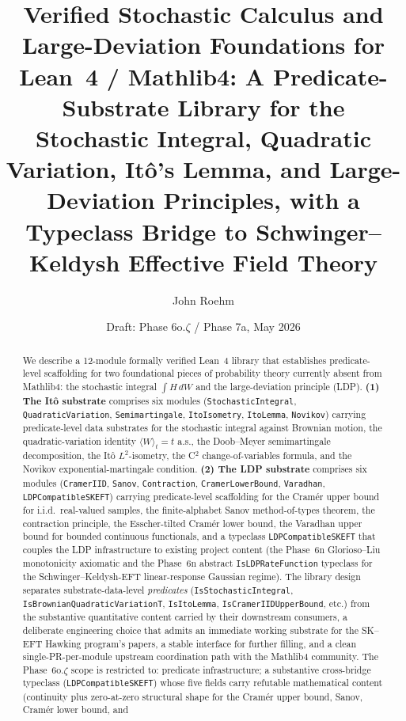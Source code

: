 \documentclass[11pt]{article}
\title{Verified Stochastic Calculus and Large-Deviation Foundations
for Lean~4 / Mathlib4: A Predicate-Substrate Library for the
Stochastic Integral, Quadratic Variation, It\^o's Lemma, and
Large-Deviation Principles, with a Typeclass Bridge to
Schwinger--Keldysh Effective Field Theory}
\author{John Roehm}
\date{Draft: Phase 6o.$\zeta$ / Phase 7a, May 2026}
\begin{document}
\maketitle

\begin{abstract}
We describe a 12-module formally verified Lean~4 library that establishes
predicate-level scaffolding for two foundational pieces of probability
theory currently absent from Mathlib4: the stochastic integral $\int H\,dW$
and the large-deviation principle (LDP).
\textbf{(1) The It\^o substrate} comprises six modules
(\texttt{Stochastic\-Integral}, \texttt{Quadratic\-Variation},
\texttt{Semi\-martingale}, \texttt{Ito\-Isometry}, \texttt{Ito\-Lemma},
\texttt{Novikov}) carrying predicate-level data substrates for the
stochastic integral against Brownian motion, the quadratic-variation
identity $\langle W\rangle_t = t$ a.s., the Doob--Meyer semimartingale
decomposition, the It\^o $L^2$-isometry, the C${}^2$
change-of-variables formula, and the Novikov exponential-martingale
condition.
\textbf{(2) The LDP substrate} comprises six modules
(\texttt{Cramer\-IID}, \texttt{Sanov}, \texttt{Contraction},
\texttt{Cramer\-Lower\-Bound}, \texttt{Varadhan},
\texttt{LDP\-Compatible\-SKEFT}) carrying predicate-level scaffolding
for the Cram\'er upper bound for i.i.d.\ real-valued samples, the
finite-alphabet Sanov method-of-types theorem, the contraction
principle, the Esscher-tilted Cram\'er lower bound, the Varadhan
upper bound for bounded continuous functionals, and a typeclass
\texttt{LDPCompatibleSKEFT} that couples the LDP infrastructure to
existing project content (the Phase~6n Glorioso--Liu monotonicity
axiomatic and the Phase~6n abstract \texttt{IsLDPRateFunction}
typeclass for the Schwinger--Keldysh-EFT linear-response Gaussian
regime).
The library design separates substrate-data-level
\emph{predicates} (\texttt{IsStochasticIntegral},
\texttt{IsBrownian\-QuadraticVariationT}, \texttt{IsItoLemma},
\texttt{IsCramerIIDUpperBound}, etc.) from the substantive
quantitative content carried by their downstream consumers, a
deliberate engineering choice that admits an immediate working
substrate for the SK--EFT Hawking program's papers, a stable
interface for further filling, and a clean single-PR-per-module
upstream coordination path with the Mathlib4 community.
The Phase~6o.$\zeta$ scope is restricted to: predicate
infrastructure; a substantive cross-bridge typeclass
(\texttt{LDPCompatibleSKEFT}) whose five fields carry refutable
mathematical content (continuity plus zero-at-zero structural shape
for the Cram\'er upper bound, Sanov, Cram\'er lower bound, and

\end{abstract}
\end{document}
